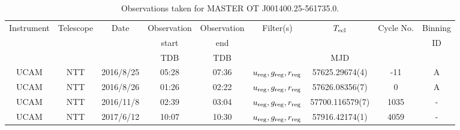 \begin{table}
	\begin{center}
		\caption{Observations taken for MASTER OT J001400.25-561735.0.}
		\label{table:observing:observation logs MASTER OT J0014}
		\begin{tabular}{ccccccccc}
			\hline
			Instrument & Telescope & Date & Observation  & Observation  & Filter(s) & $T_{\rm ecl}$ & Cycle No. & Binning \\
			 &  &  &  start &  end &  &  &  & ID \\
			 &  &  & TDB & TDB &  & MJD &  &  \\
			\hline
			\hline

            UCAM & NTT & 2016/8/25 & 05:28 & 07:36 & $u_{\rm reg},g_{\rm reg},r_{\rm reg}$ & 57625.29674(4)     & -11   & A \\
            UCAM & NTT & 2016/8/26 & 01:26 & 02:22 & $u_{\rm reg},g_{\rm reg},r_{\rm reg}$ & 57626.08356(7)     &   0   & A \\
            UCAM & NTT & 2016/11/8 & 02:39 & 03:04 & $u_{\rm reg},g_{\rm reg},r_{\rm reg}$ & 57700.116579(7)    & 1035  & - \\
            UCAM & NTT & 2017/6/12 & 10:07 & 10:30 & $u_{\rm reg},g_{\rm reg},r_{\rm reg}$ & 57916.42174(1)     & 4059  & - \\
		   \hline
		\end{tabular}
	\end{center}
\end{table}